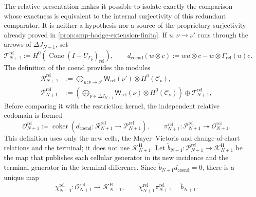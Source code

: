 The relative presentation makes it possible to isolate exactly the comparison whose
exactness is equivalent to the internal surjectivity of this redundant comparator.
It is neither a hypothesis nor a source of the proprietary surjectivity already
proved in \cref{prop:amp-hodge-extension-finita}. If
\(u:\nu\to\nu'\) runs through the arrows of
\(\Delta J_{N+1}\), set
\begin{equation}\label{eq:amp-hodge-relacion-coend}
 \mathscr T_{N+1}^{\mathrm{rel}}
 :=H^0\!\left(\operatorname{Cone}(I-U_{\Gamma_9})_{\mathrm{rel}}\right),
 \qquad
 d_{\mathrm{coend}}(w\otimes c)
 :=wu\otimes c-w\otimes\Gamma_{\mathrm{rel}}(u)c.
\end{equation}
The definition of the coend provides the modules
\begin{align}
 \mathscr R_{N+1}^{\mathrm{rel}}
 &:=
 \bigoplus_{u:\nu\to\nu'}
 \mathsf W_{\mathrm{rel}}(\nu')\otimes H^0(\mathcal C_\nu),
 \label{eq:amp-hodge-modulo-relaciones}\\
 \mathscr P_{N+1}^{\mathrm{rel}}
 &:=
 \left(
  \bigoplus_{\nu\in\Delta J_{N+1}}
  \mathsf W_{\mathrm{rel}}(\nu)\otimes H^0(\mathcal C_\nu)
 \right)\oplus\mathscr T_{N+1}^{\mathrm{rel}},
 \label{eq:amp-hodge-modulo-presentacion}
\end{align}
Before comparing it with the restriction kernel, the independent relative
codomain is formed
\begin{equation}\label{eq:amp-hodge-codominio-relativo-independiente}
 \mathscr O_{N+1}^{\mathrm{rel}}
 :=\operatorname{coker}
 \left(
  d_{\mathrm{coend}}:
  \mathscr R_{N+1}^{\mathrm{rel}}
  \longrightarrow\mathscr P_{N+1}^{\mathrm{rel}}
 \right),
 \qquad
 \pi_{N+1}^{\mathrm{rel}}:
 \mathscr P_{N+1}^{\mathrm{rel}}
 \twoheadrightarrow\mathscr O_{N+1}^{\mathrm{rel}}.
\end{equation}
This definition uses only the new cells, the Mayer--Vietoris and
change-of-chart relations and the terminal; it does not use
\(\mathscr K^{\mathrm H}_{N+1}\). Let
\(\widetilde b_{N+1}:\mathscr P_{N+1}^{\mathrm{rel}}\to
\mathscr K^{\mathrm H}_{N+1}\) be the map that publishes each cellular generator
in its new incidence and the terminal generator in the terminal difference.
Since \(\widetilde b_{N+1}d_{\mathrm{coend}}=0\), there is a unique map
\begin{equation}\label{eq:amp-hodge-comparacion-codominio-relativo}
 \chi_{N+1}^{\mathrm{rel}}:
 \mathscr O_{N+1}^{\mathrm{rel}}
 \longrightarrow\mathscr K^{\mathrm H}_{N+1},
 \qquad
 \chi_{N+1}^{\mathrm{rel}}\pi_{N+1}^{\mathrm{rel}}
 =\widetilde b_{N+1}.
\end{equation}

